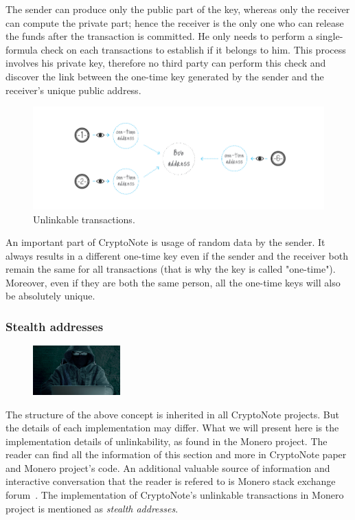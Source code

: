 The sender can produce only the public part of the key, whereas only the receiver can compute the private part; hence the receiver is the only one who can release the funds after the transaction is committed. He only needs to perform a single-formula check on each transactions to establish if it belongs to him. This process involves his private key, therefore no third party can perform this check and discover the link between the one-time key generated by the sender and the receiver's unique public address.

\begin{figure}[ht]
  \centering
  \includegraphics[width=0.9 \columnwidth,keepaspectratio]{Images/CryptoNote/unlinkable.png}
  \caption{Unlinkable transactions.~\cite{cryptonote}}
  \label{fig:unlinkable}
\end{figure}

An important part of CryptoNote is usage of random data by the sender. It always results in a different one-time key even if the sender and the receiver both remain the same for all transactions (that is why the key is called "one-time"). Moreover, even if they are both the same person, all the one-time keys will also be absolutely unique.

\subsubsection{Stealth addresses}
\begin{figure}
\centering
\includegraphics[width=0.30\textwidth]{Images/CryptoNote/stealth.jpg}
\end{figure}
The structure of the above concept is inherited in all CryptoNote projects. But the details of each implementation may differ. What we will present here is the implementation details of unlinkability, as found in the Monero project. The reader can find all the information of this section and more in CryptoNote paper~\cite{citeulike:14139412} and Monero project's code. An additional valuable source of information and interactive conversation that the reader is refered to is Monero stack exchange forum~\cite{stackexchange}. The implementation of CryptoNote's unlinkable transactions in Monero project is mentioned as \emph{stealth addresses}.

